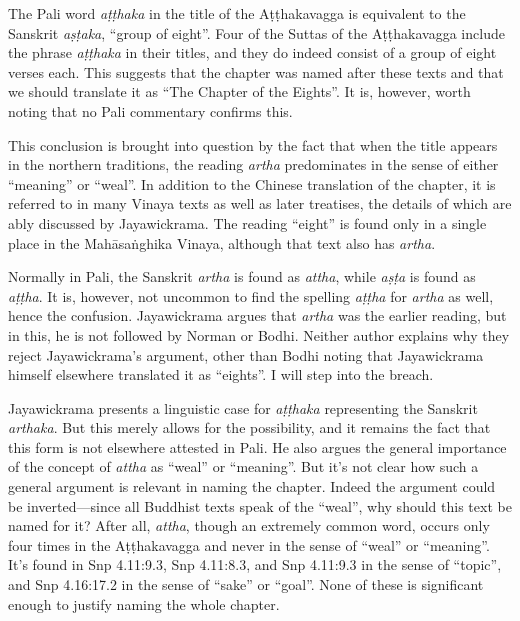 \documentclass[12pt,openany]{book}%
\begin{document}
The Pali word \textit{\textsanskrit{aṭṭhaka}} in the title of the \textsanskrit{Aṭṭhakavagga} is equivalent to the Sanskrit \textit{\textsanskrit{aṣṭaka}}, “group of eight”. Four of the Suttas of the \textsanskrit{Aṭṭhakavagga} include the phrase \textit{\textsanskrit{aṭṭhaka}} in their titles, and they do indeed consist of a group of eight verses each. This suggests that the chapter was named after these texts and that we should translate it as “The Chapter of the Eights”. It is, however, worth noting that no Pali commentary confirms this.

This conclusion is brought into question by the fact that when the title appears in the northern traditions, the reading \textit{artha} predominates in the sense of either “meaning” or “weal”. In addition to the Chinese translation of the chapter, it is referred to in many Vinaya texts as well as later treatises, the details of which are ably discussed by Jayawickrama. The reading “eight” is found only in a single place in the \textsanskrit{Mahāsaṅghika} Vinaya, although that text also has \textit{artha}.

Normally in Pali, the Sanskrit \textit{artha} is found as \textit{attha}, while \textit{\textsanskrit{aṣṭa}} is found as \textit{\textsanskrit{aṭṭha}}. It is, however, not uncommon to find the spelling \textit{\textsanskrit{aṭṭha}} for \textit{artha} as well, hence the confusion. Jayawickrama argues that \textit{artha} was the earlier reading, but in this, he is not followed by Norman or Bodhi. Neither author explains why they reject Jayawickrama’s argument, other than Bodhi noting that Jayawickrama himself elsewhere translated it as “eights”. I will step into the breach.

Jayawickrama presents a linguistic case for \textit{\textsanskrit{aṭṭhaka}} representing the Sanskrit \textit{arthaka}. But this merely allows for the possibility, and it remains the fact that this form is not elsewhere attested in Pali. He also argues the general importance of the concept of \textit{attha} as “weal” or “meaning”. But it’s not clear how such a general argument is relevant in naming the chapter. Indeed the argument could be inverted—since all Buddhist texts speak of the “weal”, why should this text be named for it? After all, \textit{attha}, though an extremely common word, occurs only four times in the \textsanskrit{Aṭṭhakavagga} and never in the sense of “weal” or “meaning”. It’s found in Snp 4.11:9.3, Snp 4.11:8.3, and Snp 4.11:9.3 in the sense of “topic”, and Snp 4.16:17.2 in the sense of “sake” or “goal”. None of these is significant enough to justify naming the whole chapter.
\end{document}
